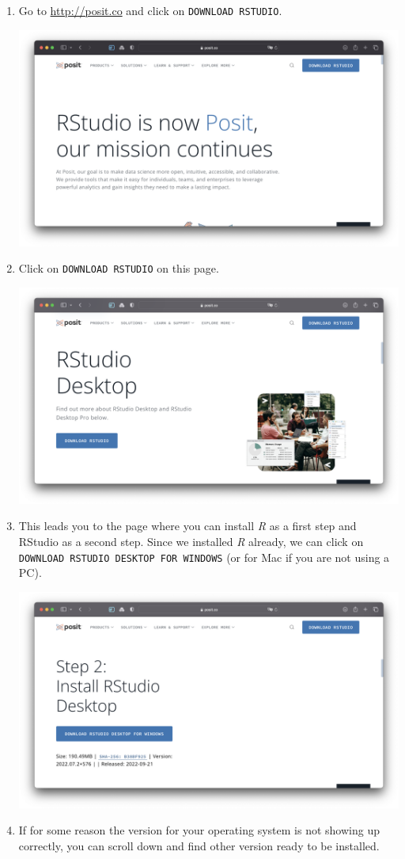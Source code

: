 \documentclass[
  letterpaper,
]{krantz}
\begin{document}
\begin{enumerate}
\def\labelenumi{\arabic{enumi}.}
\item
  Go to \url{http://posit.co} and click on \texttt{DOWNLOAD\ RSTUDIO}.

  \includegraphics{images/chapter_03_img/rstudio/01_posit_main_page.png}
\item
  Click on \texttt{DOWNLOAD\ RSTUDIO} on this page.

  \includegraphics{images/chapter_03_img/rstudio/02_posit_rstudio_desktop.png}
\item
  This leads you to the page where you can install \emph{R} as a first
  step and RStudio as a second step. Since we installed \emph{R}
  already, we can click on
  \texttt{DOWNLOAD\ RSTUDIO\ DESKTOP\ FOR\ WINDOWS} (or for Mac if you
  are not using a PC).

  \includegraphics{images/chapter_03_img/rstudio/03_posit_installer.png}
\item
  If for some reason the version for your operating system is not
  showing up correctly, you can scroll down and find other version ready
  to be installed.


\end{enumerate}
\end{document}
